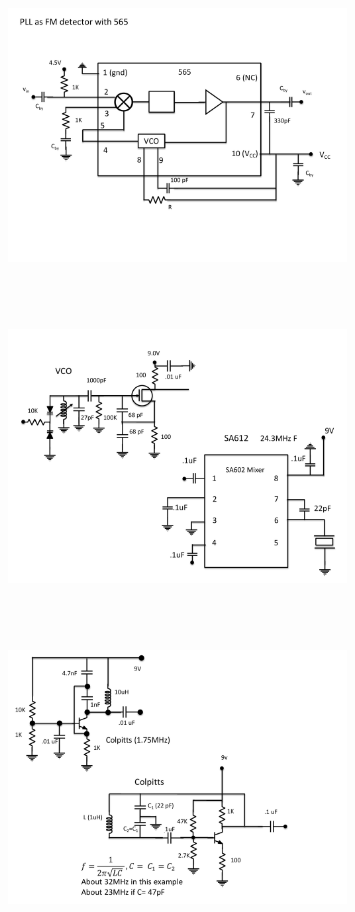 \begin{figure} 
\center
\includegraphics[width=0.8\textwidth,natwidth=642,natheight=610, height=80mm, width=88mm]{circuit18.pdf}
\end{figure}
\begin{figure} 
\center
\includegraphics[width=0.8\textwidth,natwidth=642,natheight=610, height=80mm, width=88mm]{circuit19.pdf}
\end{figure}
\begin{figure} 
\center
\includegraphics[width=0.8\textwidth,natwidth=642,natheight=610, height=80mm, width=88mm]{circuit21.pdf}
\end{figure}

